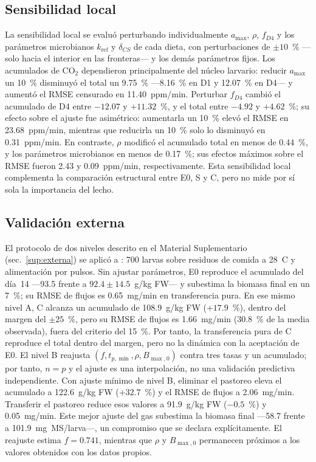 \subsection{Sensibilidad local}
\label{sec:sensibilidad}

La sensibilidad local se evaluó perturbando individualmente $a_{\max}$, $\rho$, $f_{D4}$ y los parámetros microbianos $k_{\mathrm{ref}}$ y $\delta_{CS}$ de cada dieta, con perturbaciones de $\pm 10$~\% ---solo hacia el interior en las fronteras--- y los demás parámetros fijos. Los acumulados de CO$_2$ dependieron principalmente del núcleo larvario: reducir $a_{\max}$ un 10~\% disminuyó el total un 9.75~\% ---8.16~\% en D1 y 12.07~\% en D4--- y aumentó el RMSE censurado en 11.40~ppm/min. Perturbar $f_{D4}$ cambió el acumulado de D4 entre $-12.07$ y $+11.32$~\%, y el total entre $-4.92$ y $+4.62$~\%; su efecto sobre el ajuste fue asimétrico: aumentarla un 10~\% elevó el RMSE en 23.68~ppm/min, mientras que reducirla un 10~\% solo lo disminuyó en 0.31~ppm/min. En contraste, $\rho$ modificó el acumulado total en menos de 0.44~\%, y los parámetros microbianos en menos de 0.17~\%; sus efectos máximos sobre el RMSE fueron 2.43 y 0.09~ppm/min, respectivamente. Esta sensibilidad local complementa la comparación estructural entre E0, S y C, pero no mide por sí sola la importancia del lecho.

\subsection{Validación externa}
\label{sec:externa}

El protocolo de dos niveles descrito en el Material Suplementario (sec.~\ref{sup:externa}) se aplicó a \textcite{ermolaevGreenhouseGasEmissions2019}: 700 larvas sobre residuos de comida a 28~\textdegree C y alimentación por pulsos. Sin ajustar parámetros, E0 reproduce el acumulado del día~14 ---93.5 frente a $92.4 \pm 14.5$~g/kg FW--- y subestima la biomasa final en un 7~\%; su RMSE de flujos es 0.65~mg/min en transferencia pura. En ese mismo nivel A, C alcanza un acumulado de 108.9~g/kg FW ($+17.9$~\%), dentro del margen del $\pm 25$~\%, pero su RMSE de flujos es 1.66~mg/min (30.8~\% de la media observada), fuera del criterio del 15~\%. Por tanto, la transferencia pura de C reproduce el total dentro del margen, pero no la dinámica con la aceptación de E0. El nivel B reajusta $(f,t_{p,\min},\rho,B_{\max,0})$ contra tres tasas y un acumulado; por tanto, $n=p$ y el ajuste es una interpolación, no una validación predictiva independiente. Con ajuste mínimo de nivel B, eliminar el pastoreo eleva el acumulado a 122.6~g/kg FW ($+32.7$~\%) y el RMSE de flujos a 2.06~mg/min. Transferir el pastoreo reduce esos valores a 91.9~g/kg FW ($-0.5$~\%) y 0.05~mg/min. Este mejor ajuste del gas subestima la biomasa final ---58.7 frente a 101.9~mg~MS/larva---, un compromiso que se declara explícitamente. El reajuste estima $f = 0.741$, mientras que $\rho$ y $B_{\max,0}$ permanecen próximos a los valores obtenidos con los datos propios.

